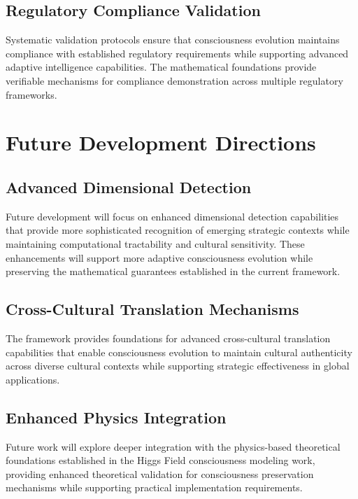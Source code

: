 \documentclass[12pt]{article}
\begin{document}
\subsection{Regulatory Compliance Validation}

Systematic validation protocols ensure that consciousness evolution maintains compliance with established regulatory requirements while supporting advanced adaptive intelligence capabilities. The mathematical foundations provide verifiable mechanisms for compliance demonstration across multiple regulatory frameworks.

\section{Future Development Directions}

\subsection{Advanced Dimensional Detection}

Future development will focus on enhanced dimensional detection capabilities that provide more sophisticated recognition of emerging strategic contexts while maintaining computational tractability and cultural sensitivity. These enhancements will support more adaptive consciousness evolution while preserving the mathematical guarantees established in the current framework.

\subsection{Cross-Cultural Translation Mechanisms}

The framework provides foundations for advanced cross-cultural translation capabilities that enable consciousness evolution to maintain cultural authenticity across diverse cultural contexts while supporting strategic effectiveness in global applications.

\subsection{Enhanced Physics Integration}

Future work will explore deeper integration with the physics-based theoretical foundations established in the Higgs Field consciousness modeling work, providing enhanced theoretical validation for consciousness preservation mechanisms while supporting practical implementation requirements.
\end{document}
